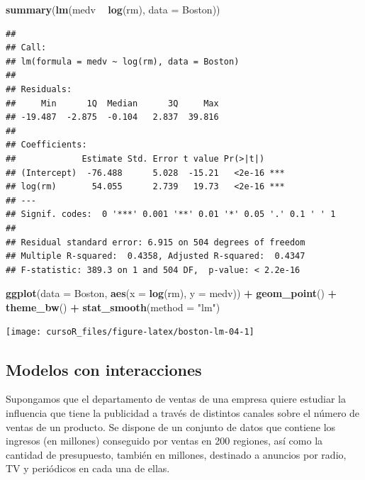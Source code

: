 \documentclass[]{book}
\newenvironment{Shaded}{\begin{snugshade}}{\end{snugshade}}
\newcommand{\KeywordTok}[1]{\textcolor[rgb]{0.13,0.29,0.53}{\textbf{#1}}}
\newcommand{\DataTypeTok}[1]{\textcolor[rgb]{0.13,0.29,0.53}{#1}}
\newcommand{\StringTok}[1]{\textcolor[rgb]{0.31,0.60,0.02}{#1}}
\newcommand{\OperatorTok}[1]{\textcolor[rgb]{0.81,0.36,0.00}{\textbf{#1}}}
\newcommand{\NormalTok}[1]{#1}
\begin{document}
\begin{Shaded}
\begin{Highlighting}[]
\KeywordTok{summary}\NormalTok{(}\KeywordTok{lm}\NormalTok{(medv }\OperatorTok{~}\StringTok{ }\KeywordTok{log}\NormalTok{(rm), }\DataTypeTok{data =}\NormalTok{ Boston))}
\end{Highlighting}
\end{Shaded}

\begin{verbatim}
## 
## Call:
## lm(formula = medv ~ log(rm), data = Boston)
## 
## Residuals:
##     Min      1Q  Median      3Q     Max 
## -19.487  -2.875  -0.104   2.837  39.816 
## 
## Coefficients:
##             Estimate Std. Error t value Pr(>|t|)    
## (Intercept)  -76.488      5.028  -15.21   <2e-16 ***
## log(rm)       54.055      2.739   19.73   <2e-16 ***
## ---
## Signif. codes:  0 '***' 0.001 '**' 0.01 '*' 0.05 '.' 0.1 ' ' 1
## 
## Residual standard error: 6.915 on 504 degrees of freedom
## Multiple R-squared:  0.4358, Adjusted R-squared:  0.4347 
## F-statistic: 389.3 on 1 and 504 DF,  p-value: < 2.2e-16
\end{verbatim}

\begin{Shaded}
\begin{Highlighting}[]
\KeywordTok{ggplot}\NormalTok{(}\DataTypeTok{data =}\NormalTok{ Boston, }\KeywordTok{aes}\NormalTok{(}\DataTypeTok{x =} \KeywordTok{log}\NormalTok{(rm), }\DataTypeTok{y =}\NormalTok{ medv)) }\OperatorTok{+}
\StringTok{  }\KeywordTok{geom_point}\NormalTok{() }\OperatorTok{+}
\StringTok{  }\KeywordTok{theme_bw}\NormalTok{() }\OperatorTok{+}\StringTok{ }
\StringTok{  }\KeywordTok{stat_smooth}\NormalTok{(}\DataTypeTok{method =} \StringTok{"lm"}\NormalTok{)}
\end{Highlighting}
\end{Shaded}

\begin{center}\texttt{[image: cursoR\_files/figure-latex/boston-lm-04-1]} \end{center}

\subsection{Modelos con interacciones}\label{modelos-con-interacciones}

Supongamos que el departamento de ventas de una empresa quiere estudiar
la influencia que tiene la publicidad a través de distintos canales
sobre el número de ventas de un producto. Se dispone de un conjunto de
datos que contiene los ingresos (en millones) conseguido por ventas en
200 regiones, así como la cantidad de presupuesto, también en millones,
destinado a anuncios por radio, TV y periódicos en cada una de ellas.
\end{document}
